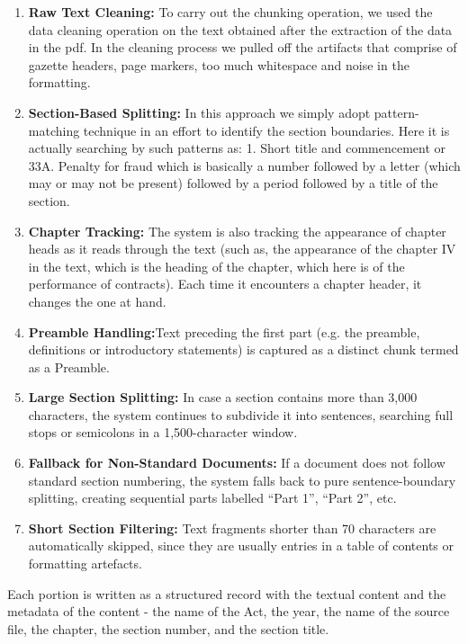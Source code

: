 \documentclass[12pt,a4paper]{article}
\begin{document}
\begin{enumerate}
  \item \textbf{Raw Text Cleaning:} To carry out the chunking operation, we used the data cleaning operation on the text obtained after the extraction of the data in the pdf. In the cleaning process we pulled off the artifacts that comprise of gazette headers, page markers, too much whitespace and noise in the formatting.
  \item \textbf{Section-Based Splitting:} In this approach we simply adopt pattern-matching technique in an effort to identify the section boundaries. Here it is actually searching by such patterns as: 1. Short title and commencement or 33A. Penalty for fraud which is basically a number followed by a letter (which may or may not be present) followed by a period followed by a title of the section.
  \item \textbf{Chapter Tracking:} The system is also tracking the appearance of chapter heads as it reads through the text (such as, the appearance of the chapter IV in the text, which is the heading of the chapter, which here is of the performance of contracts). Each time it encounters a chapter header, it changes the one at hand.

  \item \textbf{Preamble Handling:}Text preceding the first part (e.g. the preamble, definitions or introductory statements) is captured as a distinct chunk termed as a Preamble.
  \item \textbf{Large Section Splitting:} In case a section contains more than 3,000 characters, the system continues to subdivide it into sentences, searching full stops or semicolons in a 1,500-character window.

  \item \textbf{Fallback for Non-Standard Documents:} If a document does not follow standard section numbering, the system falls back to pure sentence-boundary splitting, creating sequential parts labelled ``Part 1'', ``Part 2'', etc.
  \item \textbf{Short Section Filtering:} Text fragments shorter than 70 characters are automatically skipped, since they are usually entries in a table of contents or formatting artefacts.
\end{enumerate}

Each portion is written as a structured record with the textual content and the metadata of the content - the name of the Act, the year, the name of the source file, the chapter, the section number, and the section title.
\end{document}
